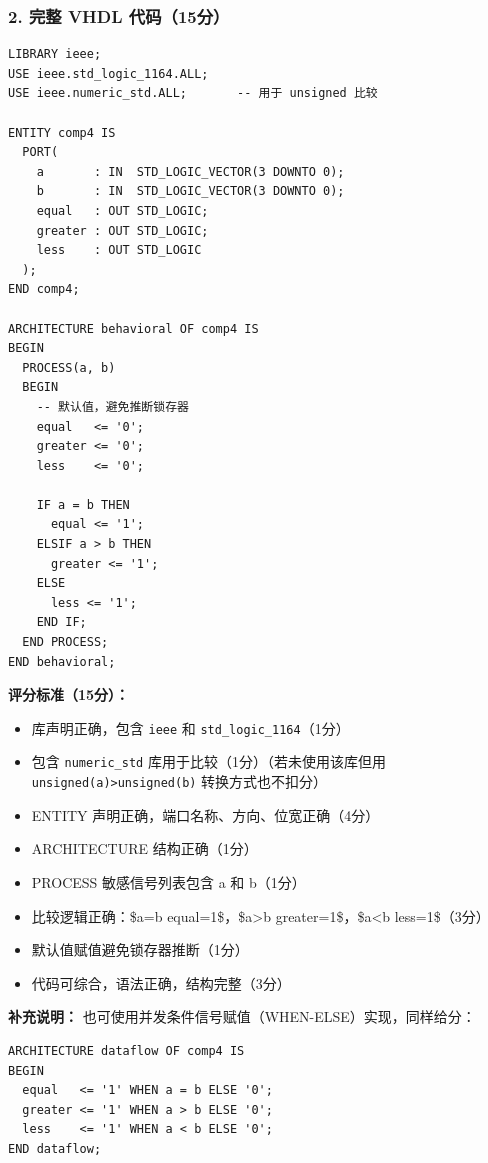 \subsubsection*{2. 完整 VHDL 代码（15分）}

\begin{lstlisting}[style=Vivado]
LIBRARY ieee;
USE ieee.std_logic_1164.ALL;
USE ieee.numeric_std.ALL;       -- 用于 unsigned 比较

ENTITY comp4 IS
  PORT(
    a       : IN  STD_LOGIC_VECTOR(3 DOWNTO 0);
    b       : IN  STD_LOGIC_VECTOR(3 DOWNTO 0);
    equal   : OUT STD_LOGIC;
    greater : OUT STD_LOGIC;
    less    : OUT STD_LOGIC
  );
END comp4;

ARCHITECTURE behavioral OF comp4 IS
BEGIN
  PROCESS(a, b)
  BEGIN
    -- 默认值，避免推断锁存器
    equal   <= '0';
    greater <= '0';
    less    <= '0';

    IF a = b THEN
      equal <= '1';
    ELSIF a > b THEN
      greater <= '1';
    ELSE
      less <= '1';
    END IF;
  END PROCESS;
END behavioral;
\end{lstlisting}

\textbf{评分标准（15分）：}
\begin{itemize}
    \item 库声明正确，包含 \texttt{ieee} 和 \texttt{std\_logic\_1164}（1分）
    \item 包含 \texttt{numeric\_std} 库用于比较（1分）（若未使用该库但用 \texttt{unsigned(a)>unsigned(b)} 转换方式也不扣分）
    \item ENTITY 声明正确，端口名称、方向、位宽正确（4分）
    \item ARCHITECTURE 结构正确（1分）
    \item PROCESS 敏感信号列表包含 a 和 b（1分）
    \item 比较逻辑正确：\$a=b \rightarrow equal=1\$，\$a>b \rightarrow greater=1\$，\$a<b \rightarrow less=1\$（3分）
    \item 默认值赋值避免锁存器推断（1分）
    \item 代码可综合，语法正确，结构完整（3分）
\end{itemize}

\textbf{补充说明：} 也可使用并发条件信号赋值（WHEN-ELSE）实现，同样给分：
\begin{lstlisting}[style=Vivado]
ARCHITECTURE dataflow OF comp4 IS
BEGIN
  equal   <= '1' WHEN a = b ELSE '0';
  greater <= '1' WHEN a > b ELSE '0';
  less    <= '1' WHEN a < b ELSE '0';
END dataflow;
\end{lstlisting}

